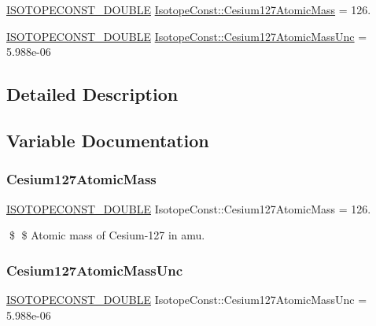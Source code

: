 \begin{DoxyCompactItemize}
\item 
\mbox{\hyperlink{group___isotope_const-_macros_ga8f45a7272ce02c0b4c65c44636ed719a}{I\+S\+O\+T\+O\+P\+E\+C\+O\+N\+S\+T\+\_\+\+D\+O\+U\+B\+LE}} \mbox{\hyperlink{group___isotope_const-_cesium-_cs127_ga32e1da018e47ce60c614061fe50bd319}{Isotope\+Const\+::\+Cesium127\+Atomic\+Mass}} = 126.
\item 
\mbox{\hyperlink{group___isotope_const-_macros_ga8f45a7272ce02c0b4c65c44636ed719a}{I\+S\+O\+T\+O\+P\+E\+C\+O\+N\+S\+T\+\_\+\+D\+O\+U\+B\+LE}} \mbox{\hyperlink{group___isotope_const-_cesium-_cs127_gad4dc3cd2d772093ee2abca588dc40a10}{Isotope\+Const\+::\+Cesium127\+Atomic\+Mass\+Unc}} = 5.\+988e-\/06
\end{DoxyCompactItemize}


\subsection{Detailed Description}


\subsection{Variable Documentation}
\mbox{\label{group___isotope_const-_cesium-_cs127_ga32e1da018e47ce60c614061fe50bd319}} 
\subsubsection{\texorpdfstring{Cesium127\+Atomic\+Mass}{Cesium127AtomicMass}}
{\footnotesize\ttfamily \mbox{\hyperlink{group___isotope_const-_macros_ga8f45a7272ce02c0b4c65c44636ed719a}{I\+S\+O\+T\+O\+P\+E\+C\+O\+N\+S\+T\+\_\+\+D\+O\+U\+B\+LE}} Isotope\+Const\+::\+Cesium127\+Atomic\+Mass = 126.}

\$ \$ Atomic mass of Cesium-\/127 in amu. \mbox{\label{group___isotope_const-_cesium-_cs127_gad4dc3cd2d772093ee2abca588dc40a10}} 
\subsubsection{\texorpdfstring{Cesium127\+Atomic\+Mass\+Unc}{Cesium127AtomicMassUnc}}
{\footnotesize\ttfamily \mbox{\hyperlink{group___isotope_const-_macros_ga8f45a7272ce02c0b4c65c44636ed719a}{I\+S\+O\+T\+O\+P\+E\+C\+O\+N\+S\+T\+\_\+\+D\+O\+U\+B\+LE}} Isotope\+Const\+::\+Cesium127\+Atomic\+Mass\+Unc = 5.\+988e-\/06}

